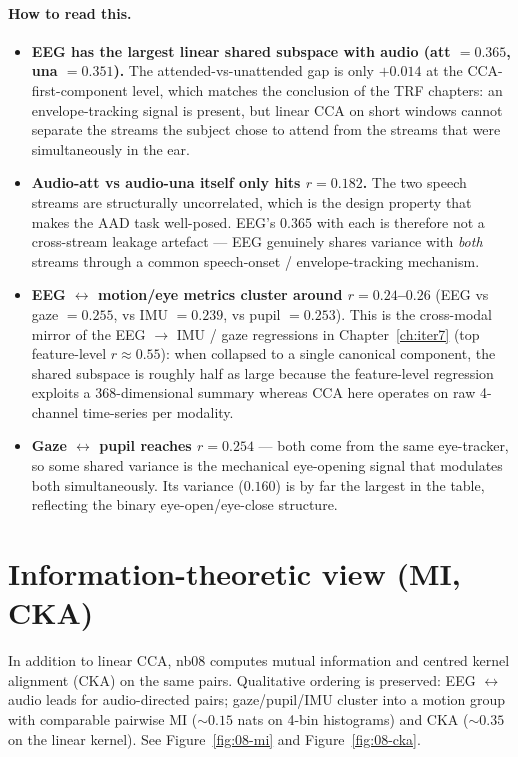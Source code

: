 \paragraph{How to read this.}
\begin{itemize}
  \item \textbf{EEG has the largest linear shared subspace with audio
        (att $= 0.365$, una $= 0.351$).} The attended-vs-unattended gap is
        only $+0.014$ at the CCA-first-component level, which matches the
        conclusion of the TRF chapters: an envelope-tracking signal is
        present, but linear CCA on short windows cannot separate the
        streams the subject chose to attend from the streams that were
        simultaneously in the ear.
  \item \textbf{Audio-att vs audio-una itself only hits $r = 0.182$.}
        The two speech streams are structurally uncorrelated, which is
        the design property that makes the AAD task well-posed. EEG's
        $0.365$ with each is therefore not a cross-stream leakage
        artefact --- EEG genuinely shares variance with \emph{both}
        streams through a common speech-onset / envelope-tracking
        mechanism.
  \item \textbf{EEG $\leftrightarrow$ motion/eye metrics cluster around
        $r = 0.24$--$0.26$} (EEG vs gaze $= 0.255$, vs IMU $= 0.239$,
        vs pupil $= 0.253$). This is the cross-modal mirror of the
        EEG $\rightarrow$ IMU / gaze regressions in
        Chapter~\ref{ch:iter7} (top feature-level $r \approx 0.55$):
        when collapsed to a single canonical component, the shared
        subspace is roughly half as large because the feature-level
        regression exploits a 368-dimensional summary whereas CCA here
        operates on raw 4-channel time-series per modality.
  \item \textbf{Gaze $\leftrightarrow$ pupil reaches $r = 0.254$} --- both
        come from the same eye-tracker, so some shared variance is the
        mechanical eye-opening signal that modulates both simultaneously.
        Its variance ($0.160$) is by far the largest in the table,
        reflecting the binary eye-open/eye-close structure.
\end{itemize}

\section{Information-theoretic view (MI, CKA)}

In addition to linear CCA, nb08 computes mutual information and centred
kernel alignment (CKA) on the same pairs. Qualitative ordering is
preserved: EEG $\leftrightarrow$ audio leads for audio-directed pairs;
gaze/pupil/IMU cluster into a motion group with comparable pairwise
MI ($\sim 0.15$ nats on 4-bin histograms) and CKA ($\sim 0.35$ on the
linear kernel). See Figure~\ref{fig:08-mi} and
Figure~\ref{fig:08-cka}.

